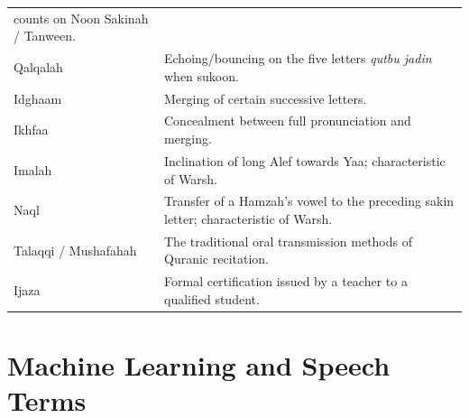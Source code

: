 \documentclass[12pt,a4paper]{report}
\begin{document}
\begin{table}[H]
\begin{tabular}{lp{9cm}}
                                     counts on Noon Sakinah / Tanween. \\
    Qalqalah                        & Echoing/bouncing on the five letters
                                     \emph{qutbu jadin} when sukoon. \\
    Idghaam                         & Merging of certain successive
                                     letters. \\
    Ikhfaa                          & Concealment between full
                                     pronunciation and merging. \\
    Imalah                          & Inclination of long Alef
                                     towards Yaa; characteristic of
                                     Warsh. \\
    Naql                            & Transfer of a Hamzah's vowel to
                                     the preceding sakin letter;
                                     characteristic of Warsh. \\
    Talaqqi / Mushafahah            & The traditional oral transmission
                                     methods of Quranic recitation. \\
    Ijaza                           & Formal certification issued by a
                                     teacher to a qualified student. \\
    \bottomrule
  \end{tabular}
\end{table}

\section{Machine Learning and Speech Terms}
\end{document}
